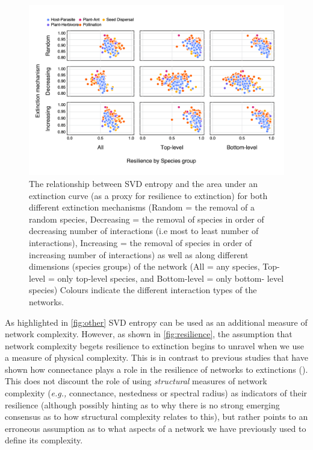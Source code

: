 \begin{refsection}
\begin{figure}[h]
    \centering
    \includegraphics[width=\textwidth]{figures/entropy_v_AUCall.png}
    \caption{The relationship between SVD entropy and the area under an
extinction curve (as a proxy for resilience to extinction) for both different
extinction mechanisms (Random = the removal of a random species, Decreasing =
the removal of species in order of decreasing number of interactions (i.e most
to least number of interactions), Increasing = the removal of species in order
of increasing number of interactions) as well as along different dimensions
(species groups) of the network (All = any species, Top-level = only top-level
species, and Bottom-level = only bottom- level species) Colours indicate the
different interaction types of the networks.}
    \label{fig:resilience}
\end{figure}

As highlighted in \autoref{fig:other} SVD entropy can be used as an additional
measure of network complexity. However, as shown in \autoref{fig:resilience}, the
assumption that network complexity begets resilience to extinction begins to
unravel when we use a measure of physical complexity. This is in contrast to
previous studies that have shown how connectance plays a role in the resilience
of networks to extinctions (\cite{Dunne2002NetStr, Memmott2004TolPol}). This does
not discount the role of using \emph{structural} measures of network complexity
(\emph{e.g.,} connectance, nestedness or spectral radius) as indicators of their
resilience (although possibly hinting as to why there is no strong emerging
consensus as to how structural complexity relates to this), but rather points to
an erroneous assumption as to what aspects of a network we have previously used
to define its complexity.


\end{refsection}
